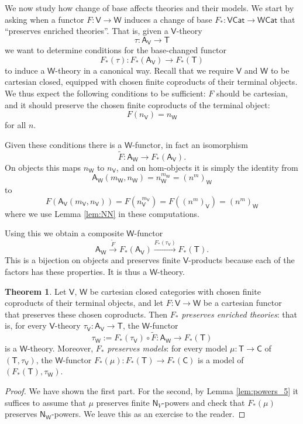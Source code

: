 \documentclass{amsart}
\theoremstyle{definition}
\newtheorem{theorem}{Theorem}
\newcommand{\Cat}{\mathsf{Cat}}
\newcommand{\NN}{\mathsf{N}}
\newcommand{\A}{\mathsf{A}}
\newcommand{\V}{\mathsf{V}}
\newcommand{\W}{\mathsf{W}}
\newcommand{\C}{\mathsf{C}}
\newcommand{\T}{\mathsf{T}}
\newcommand{\maps}{\colon}
\begin{document}
We now study how change of base affects theories and their models.  We start by asking when a functor $F \maps \V \to \W$ induces a change of base $F_*\maps\V\Cat \to \W\Cat$ that ``preserves enriched theories''.   That is, given a $\V$-theory 
\[      \tau \maps  \A_\V \to \T \]
we want to determine conditions for the base-changed functor 
\[    F_*(\tau) \maps  F_*(\A_\V) \to  F_*(\T) \]
to induce a $\W$-theory in a canonical way.   Recall that we require $\V$ and $\W$ to be
cartesian closed, equipped with chosen finite coproducts of their terminal objects.   We thus expect the following conditions to be sufficient: $F$ should be cartesian, and it should
preserve the chosen finite coproducts of the terminal object:
\[      F(n_\V) = n_\W  \]
for all $n$.   

Given these conditions there is a $\W$-functor, in fact an isomorphism
\[    \tilde{F} \maps \A_\W \to F_*(\A_\V)  . \]
On objects this maps $n_\W$ to $n_\V$, and on hom-objects it is simply the identity from
\[     \A_\W(m_\W, n_\W) = n_\W^{m_\W} = (n^m)_\W \]
to 
\[    F(\A_\V(m_\V, n_\V)) = F(n_\V^{m_\V}) = F((n^m)_\V) = (n^m)_\W \]
where we use Lemma \ref{lem:NN} in these computations.

Using this we obtain a composite $\W$-functor
\[   \A_\W \stackrel{\tilde{F}}{\longrightarrow} 
  F_*(\A_\V) \xrightarrow{F_*(\tau_\V)} F_*(\T). \]
This is a bijection on objects and preserves finite $\V$-products because each of the factors
has these properties.   It is thus a $\W$-theory.   

\begin{theorem}
\label{thm:change-of-base}
Let $\V$, $\W$ be cartesian closed categories with chosen finite coproducts of their terminal objects, and let $F\maps \V \to \W$ be a cartesian functor that preserves these chosen coproducts.  Then $F_*$ \emph{preserves enriched theories}: that is, for every $\V$-theory $\tau_\V\maps \A_\V\to \T$, the $\W$-functor 
\[ \tau_\W := F_*(\tau_\V) \circ \tilde{F} \maps \A_\W \to F_*(\T)\]
is a $\W$-theory.   Moreover, $F_*$ \emph{preserves models}: for every model $\mu \maps\T \to \C$ of $(\T,\tau_\V) $, the $\W$-functor $F_*(\mu) \maps F_*(\T) \to F_*(\C)$ is a model of 
$(F_*(\T), \tau_\W)$.
\end{theorem}

\begin{proof}
We have shown the first part.  For the second, by Lemma \ref{lem:powers_5} it
suffices to assume that $\mu$ preserves finite $\NN_V$-powers and check that $F_*(\mu)$
preserves $\NN_\W$-powers.  We leave this as an exercise to the reader.
\end{proof}
\end{document}
